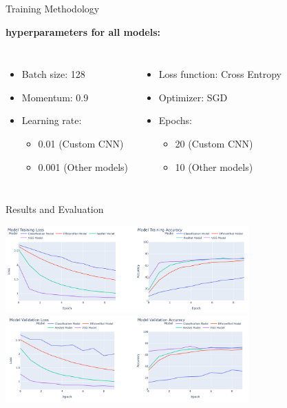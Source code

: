 \documentclass{beamer}
\begin{document}
\begin{frame}{Training Methodology}
    \begin{center}
        \textbf{\textcolor{maincolor}{hyperparameters for all models:}}
    \end{center}
    \vspace{0.5cm}
    \begin{columns}[T]
        \begin{itemize}
            \item Batch size: 128
            \item Momentum: 0.9
            \item Learning rate: 
            \begin{itemize}
                \item 0.01 (Custom CNN) 
                \item 0.001 (Other models)
            \end{itemize}
        \end{itemize}
        
        \begin{itemize}
            \item Loss function: Cross Entropy
            \item Optimizer: SGD
            \item Epochs: 
            \begin{itemize}
                \item 20 (Custom CNN) 
                \item 10 (Other models)
            \end{itemize}
        \end{itemize}
    \end{columns}
\end{frame}

\begin{frame}{Results and Evaluation}
    \begin{center}
        \includegraphics[width=0.7\textwidth]{eval2.png}
        \includegraphics[width=0.7\textwidth]{eval3.png}
    \end{center} 
\end{frame}
\end{document}
